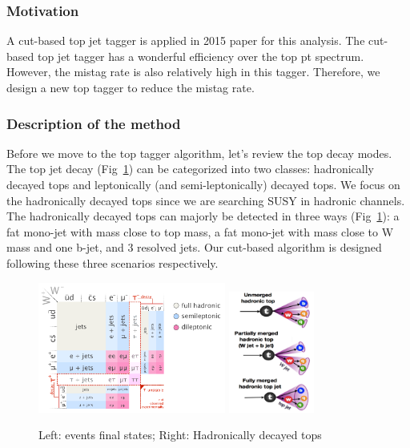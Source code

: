 \subsubsection{Motivation}
A cut-based top jet tagger is applied in 2015 paper for this analysis\cite{CMS-PAS-SUS-16-030}. The cut-based top jet tagger has a wonderful efficiency over the top pt spectrum. However, the mistag rate is also relatively high in this tagger. Therefore, we design a new top tagger to reduce the mistag rate. 

\subsubsection{Description of the method}

Before we move to the top tagger algorithm, let’s review the top decay modes. The top jet decay (Fig~\ref{fig:c4twdecaymod}) can be categorized into two classes: hadronically decayed tops and leptonically (and semi-leptonically) decayed tops. We focus on the hadronically decayed tops since we are searching SUSY in hadronic channels. The hadronically decayed tops can majorly be detected in three ways (Fig~\ref{fig:c4twdecaymod}): a fat mono-jet with mass close to top mass, a fat mono-jet with mass close to W mass and one b-jet, and 3 resolved jets. Our cut-based algorithm is designed following these three scenarios respectively. 

\begin{figure}[htbp]
 \begin{center}
  \includegraphics[width=0.55\textwidth]{figures/c4/c4_top_w_decaymod.png}
  \includegraphics[width=0.25\textwidth]{figures/c4/c4_tagger_hadtopdecay.png}
 \end{center}
 \caption{Left: \ttbar events final states; Right: Hadronically decayed tops}
 \label{fig:c4twdecaymod}
\end{figure}

